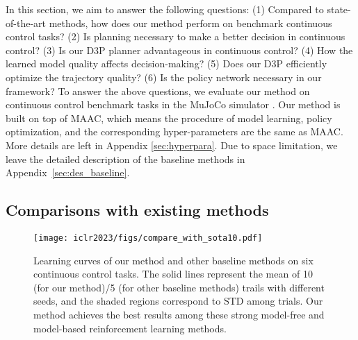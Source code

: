 \documentclass{article} %
\newcommand{\yue}[1]{ {#1}}
\newcommand{\revision}[1]{{#1}}
\begin{document}
In this section, we aim to answer the following questions: (1) Compared to state-of-the-art methods, how does our method perform on benchmark continuous control tasks? (2) Is planning necessary to make a better decision in continuous control? (3) Is our D3P planner advantageous in continuous control?  (4) How the learned model quality affects decision-making? (5) Does our D3P efficiently optimize the trajectory quality? (6) Is  the policy network necessary in our framework?
To answer the above questions, we evaluate our method on continuous control benchmark tasks in the MuJoCo simulator { \citep{todorov2012mujoco}}. 
\yue{Our method is built on top of MAAC\citep{clavera_model-augmented_2019}, which means the procedure of model learning, policy optimization, and the corresponding hyper-parameters are the same as MAAC. More details are left in Appendix \ref{sec:hyperpara}.} Due to space limitation, we leave the detailed description of the baseline methods in Appendix~\ref{sec:des_baseline}.

 
\subsection{Comparisons with existing methods}\label{sec:experiment_result}

\vspace{-0.5cm}
\begin{figure}[!htb]
    \centering
    \texttt{[image: iclr2023/figs/compare\_with\_sota10.pdf]}
   
    \caption{ {  Learning curves of our method and other baseline methods on six continuous control tasks. The solid lines represent the mean of \revision{10 (for our method)/5 (for other baseline methods)} trails with different seeds, and the shaded regions correspond to STD among  trials. Our method achieves the best results among these strong model-free and model-based reinforcement learning methods.}}
    \label{fig:comparison_sota}
\end{figure}
\end{document}
